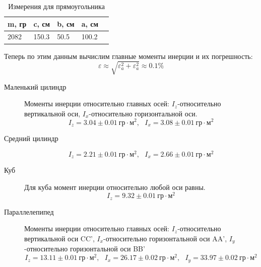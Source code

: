 \documentclass[a4paper,12pt]{article} %
\begin{document}
\begin{itemize}
\begin{table}[!ht]
    \centering
    \begin{tabular}{|l|l|l|l|l|}
    \hline
        m, гр & c, см & b, см & a, см  \\ \hline
        2082 & 150.3 & 50.5 & 100.2  \\ \hline
    \end{tabular}
    \caption{Измерения для прямоугольника}
\end{table}
Теперь по этим данным вычислим главные моменты инерции и их погрешность:
$$\varepsilon \approx \sqrt{\varepsilon^2_{a}+\varepsilon^2_{a}}\approx 0.1 \% $$
\begin{description}
    \item[Маленький цилиндр]Моменты инерции относительно главных осей:
     $I_{z}$-относительно вертикальной оси, $I_{x}$-относительно горизонтальной оси.
$$I_{z}= 3.04 \pm 0.01 \ \text{гр}\cdot \text{м}^2, \ \ \ I_{x}= 3.08 \pm 0.01 \ \text{гр}\cdot \text{м}^2$$
    \item[Средний цилиндр]
$$I_{z}= 2.21 \pm 0.01 \ \text{гр}\cdot \text{м}^2, \ \ \ I_{x}= 2.66 \pm 0.01 \ \text{гр}\cdot \text{м}^2$$
    \item[Куб]Для куба момент инерции относительно любой оси равны.
$$I_{z}= 9.32 \pm 0.01 \ \text{гр}\cdot \text{м}^2$$
    \item[Параллелепипед]Моменты инерции относительно главных осей:
    $I_{z}$-относительно вертикальной оси CC', $I_{x}$-относительно горизонтальной оси AA',
    $I_{y}$-относительно горизонтальной оси BB'
$$I_{z}= 13.11 \pm 0.01 \ \text{гр}\cdot \text{м}^2, \ \ \ I_{x}= 26.17 \pm 0.02 \ \text{гр}\cdot
 \text{м}^2, \ \ \ I_{y}= 33.97 \pm 0.02 \ \text{гр}\cdot \text{м}^2$$
\end{description}


\end{itemize}
\end{document}
